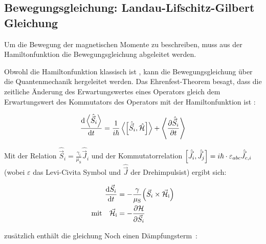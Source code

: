 \documentclass[main.tex]{subfiles}
\begin{document}
\subsection{Bewegungsgleichung: Landau-Lifschitz-Gilbert Gleichung}
Um die Bewegung der magnetischen Momente zu beschreiben, muss aus der Hamiltonfunktion die Bewegungsgleichung abgeleitet werden.

Obwohl die Hamiltonfunktion klassisch ist , kann die Bewegungsgleichung über die Quantenmechanik hergeleitet werden. 
Das Ehrenfest-Theorem besagt, dass die zeitliche Änderung des Erwartungswertes eines Operators gleich dem Erwartungswert des Kommutators des Operators mit der Hamiltonfunktion ist \cite{qm-1-Schwabl}:

\begin{align}
	\dv{\expval{\hat{\vec{S}}_i}}{t} = \frac{1}{i\hbar}
	\expval{\qty[\hat{\vec{S}}_i,
			\hat{\mathcal{H}}]} + \expval{\pdv{\hat{\vec{S}}_i}{t}}
\end{align}


Mit der Relation 
\(\hat{\vec{S}}_i = \frac{\gamma_i}{\mu_{\text{S}}}\hat{\vec{J}}_i\) 
und der Kommutatorrelation 
\(\qty[\hat{\vec{J}}_i, \hat{\vec{J}}_j] = i \hbar \cdot \varepsilon_{abc} \hat{\vec{J}}_{c,i}\) 
(wobei \(\varepsilon\) das Levi-Civita Symbol und \(\hat{\vec{J}}\) der Drehimpulsist) ergibt sich:

\begin{align}
	\dv{\vec{S}_i}{t}
	& = -\frac{\gamma}{\mu_{\text{S}}}
	\qty(\vec{S}_i \times \vec{\mathcal{H}}_{\text{i}})\\
	\text{mit} \quad \vec{\mathcal{H}}_{\text{i}} 
	& = - \pdv{\mathcal{H}}{\vec{S}_i}
\end{align}


zusätzlich enthält die gleichung Noch einen Dämpfungsterm~\cite{Gilbert-damping}:
\end{document}

